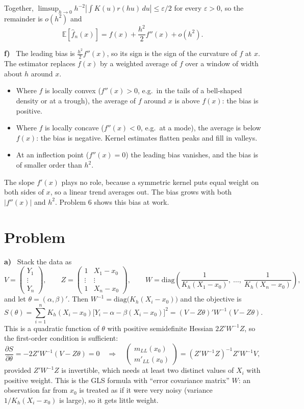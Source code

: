 \documentclass[11pt]{article}
\newcommand{\E}{\mathbb{E}}
\theoremstyle{plain}
\newcounter{problem}
\renewcommand{\theproblem}{\arabic{problem}}
\newcommand{\problem}{
	\stepcounter{problem}
	\section*{Problem \theproblem}
}
\newcommand{\itm}[1]{\par\textbf{#1)}\ }
\begin{document}
Together, $\limsup_{h\to 0} h^{-2}\left|\int K(u)r(hu)\,du\right|\le \varepsilon/2$ for every $\varepsilon>0$, so the remainder is $o(h^2)$ and
\[
\E[\hat f_n(x)] = f(x) + \frac{h^2}{2}f''(x) + o(h^2).
\]

\itm{f}
The leading bias is $\frac{h^2}{2}f''(x)$, so its sign is the sign of the curvature of $f$ at $x$. The estimator replaces $f(x)$ by a weighted average of $f$ over a window of width about $h$ around $x$.
\begin{itemize}
	\item Where $f$ is locally convex ($f''(x)>0$, e.g.\ in the tails of a bell-shaped density or at a trough), the average of $f$ around $x$ is above $f(x)$: the bias is positive.
	\item Where $f$ is locally concave ($f''(x)<0$, e.g.\ at a mode), the average is below $f(x)$: the bias is negative. Kernel estimates flatten peaks and fill in valleys.
	\item At an inflection point ($f''(x)=0$) the leading bias vanishes, and the bias is of smaller order than $h^2$.
\end{itemize}
The slope $f'(x)$ plays no role, because a symmetric kernel puts equal weight on both sides of $x$, so a linear trend averages out. The bias grows with both $|f''(x)|$ and $h^2$. Problem 6 shows this bias at work.

\problem

\itm{a}
Stack the data as
\[
V = \begin{pmatrix} Y_1\\ \vdots\\ Y_n\end{pmatrix},\qquad
Z = \begin{pmatrix} 1 & X_1-x_0\\ \vdots & \vdots\\ 1 & X_n-x_0\end{pmatrix},\qquad
W = \mathrm{diag}\left(\frac{1}{K_h(X_1-x_0)},\ \dots,\ \frac{1}{K_h(X_n-x_0)}\right),
\]
and let $\theta=(\alpha,\beta)'$. Then $W^{-1}=\mathrm{diag}\big(K_h(X_i-x_0)\big)$ and the objective is
\[
S(\theta) = \sum_{i=1}^n K_h(X_i-x_0)\big[Y_i-\alpha-\beta(X_i-x_0)\big]^2 = (V-Z\theta)'W^{-1}(V-Z\theta).
\]
This is a quadratic function of $\theta$ with positive semidefinite Hessian $2Z'W^{-1}Z$, so the first-order condition is sufficient:
\[
\frac{\partial S}{\partial\theta} = -2Z'W^{-1}(V-Z\theta) = 0
\quad\Longrightarrow\quad
\begin{pmatrix}m_{LL}(x_0)\\ m'_{LL}(x_0)\end{pmatrix} = (Z'W^{-1}Z)^{-1}Z'W^{-1}V,
\]
provided $Z'W^{-1}Z$ is invertible, which needs at least two distinct values of $X_i$ with positive weight. This is the GLS formula with ``error covariance matrix'' $W$: an observation far from $x_0$ is treated as if it were very noisy (variance $1/K_h(X_i-x_0)$ is large), so it gets little weight.
\end{document}
